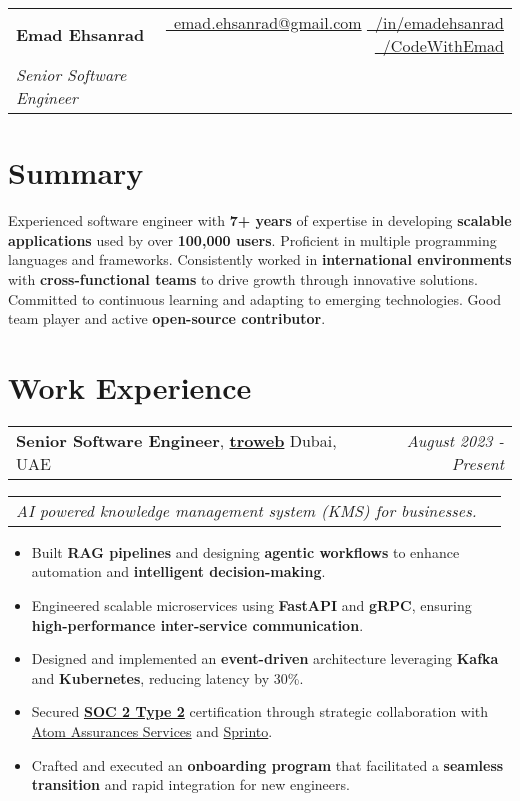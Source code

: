 \documentclass[letterpaper,11pt]{article}
\makeatletter
\newcommand{\resumeFullHeading}[5]{
   \begin{tabular*}{\textwidth}{l@{\extracolsep{\fill}}r}
       \textbf{\Huge #1}\vspace{5px} &
       \small{\href{mailto:#3}{\raisebox{-0.05\height}\faEnvelope \ #3}} \quad
       \small{\href{#4}{\raisebox{-0.05\height}\faLinkedin\ /in/emadehsanrad}} \quad
       \small{\href{#5}{\raisebox{-0.05\height}\faGithub\ /CodeWithEmad}} \\
       \textit{\large #2} & \\
   \end{tabular*}
}
\newcommand{\resumeFullHeadingWithImage}[7]{%
    \begin{minipage}[t]{0.7\textwidth}
        \huge\textbf{#1}\\[0.2em]
        \Large\textit{#2}\\[1em]
        \small{#3 #4 #5}
    \end{minipage}%
    \begin{minipage}[t]{0.3\textwidth}
        \raggedleft
        \raisebox{-2cm}[0pt][0pt]{\texttt{[image: \#6]}}
    \end{minipage}
}
\newcommand{\resumeItemSimple}[1]{
  \item\small{
    {#1}
  }
}
\newcommand{\resumeSubheadingSimple}[5]{
  \vspace{-1pt}
    \begin{tabular*}{1\textwidth}[t]{l@{\extracolsep{\fill}}r}
      \textbf{#1}, \textbf{\href{#3}{#2}} \space \small#4 & \textit{\small #5} \\
    \end{tabular*}
}
\newcommand{\resumeSubSubheading}[2]{
    \begin{tabular*}{1\textwidth}{l@{\extracolsep{\fill}}r}
      \textit{\small#1} & \textit{\small #2} \\
    \end{tabular*}\vspace{-5pt}
}
\newcommand{\resumeItemListStart}{\begin{itemize}[leftmargin=0.5cm, itemsep=1pt, parsep=0pt]} %
\newcommand{\resumeItemListEnd}{\end{itemize}\vspace{-3pt}}
\makeatother
\begin{document}
\resumeFullHeading
  {Emad Ehsanrad}
  {Senior Software Engineer}
  {emad.ehsanrad@gmail.com}
  {https://www.linkedin.com/in/emadehsanrad/}
  {https://github.com/codewithemad}


\section{Summary}
\small
Experienced software engineer with \textbf{7+ years} of expertise in
developing \textbf{scalable applications} used by over \textbf{100,000 users}. Proficient
in multiple programming languages and frameworks.
Consistently worked in \textbf{international environments} with \textbf{cross-functional teams}
to drive growth through innovative solutions. Committed to continuous learning
and adapting to emerging technologies. Good team player and active \textbf{open-source contributor}.

\section{Work Experience}

    \resumeSubheadingSimple
      {Senior Software Engineer}{troweb}{https://www.linkedin.com/company/troweb/}{Dubai, UAE}{August 2023 - Present}
      \resumeSubSubheading{AI powered knowledge management system (KMS) for businesses.}{}
      \resumeItemListStart
        \resumeItemSimple{Built \textbf{RAG pipelines} and designing \textbf{agentic workflows} to enhance automation and \textbf{intelligent decision-making}.}
        \resumeItemSimple{Engineered scalable microservices using \textbf{FastAPI} and \textbf{gRPC}, ensuring \textbf{high-performance inter-service communication}.}
        \resumeItemSimple{Designed and implemented an \textbf{event-driven} architecture leveraging \textbf{Kafka} and \textbf{Kubernetes}, reducing latency by 30\%.}
        \resumeItemSimple{Secured \href{https://sprinto.com/blog/soc-2-type-2/}{\textbf{SOC 2 Type 2}} certification through strategic collaboration with \href{https://www.linkedin.com/company/atom-assurances-services/}{Atom Assurances Services} and \href{https://www.linkedin.com/company/sprinto-com/}{Sprinto}.}
        \resumeItemSimple{Crafted and executed an \textbf{onboarding program}  that facilitated a \textbf{seamless transition} and rapid integration for new engineers.}
      \resumeItemListEnd
\end{document}
